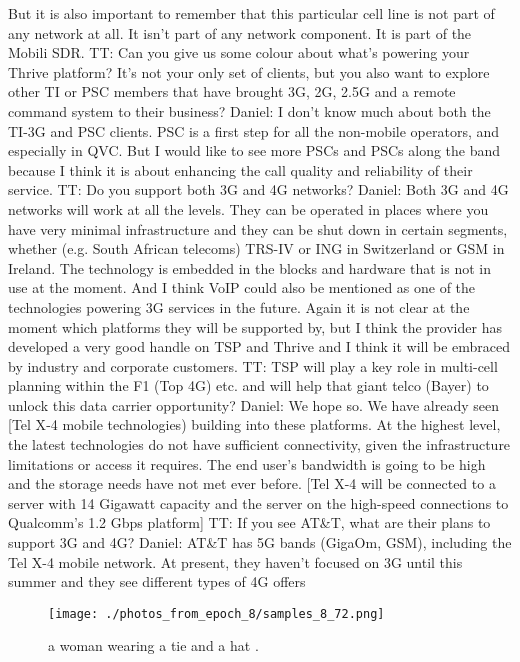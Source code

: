 \documentclass{article}%
\begin{document}
But it is also important to remember that this particular cell line is not part of any network at all. It isn't part of any network component. It is part of the Mobili SDR.\newline%
TT: Can you give us some colour about what's powering your Thrive platform? It's not your only set of clients, but you also want to explore other TI or PSC members that have brought 3G, 2G, 2.5G and a remote command system to their business?\newline%
Daniel: I don't know much about both the TI{-}3G and PSC clients. PSC is a first step for all the non{-}mobile operators, and especially in QVC. But I would like to see more PSCs and PSCs along the band because I think it is about enhancing the call quality and reliability of their service.\newline%
TT: Do you support both 3G and 4G networks?\newline%
Daniel: Both 3G and 4G networks will work at all the levels. They can be operated in places where you have very minimal infrastructure and they can be shut down in certain segments, whether (e.g. South African telecoms) TRS{-}IV or ING in Switzerland or GSM in Ireland. The technology is embedded in the blocks and hardware that is not in use at the moment.\newline%
And I think VoIP could also be mentioned as one of the technologies powering 3G services in the future. Again it is not clear at the moment which platforms they will be supported by, but I think the provider has developed a very good handle on TSP and Thrive and I think it will be embraced by industry and corporate customers.\newline%
TT: TSP will play a key role in multi{-}cell planning within the F1 (Top 4G) etc. and will help that giant telco (Bayer) to unlock this data carrier opportunity?\newline%
Daniel: We hope so. We have already seen {[}Tel X{-}4 mobile technologies) building into these platforms. At the highest level, the latest technologies do not have sufficient connectivity, given the infrastructure limitations or access it requires. The end user's bandwidth is going to be high and the storage needs have not met ever before. {[}Tel X{-}4 will be connected to a server with 14 Gigawatt capacity and the server on the high{-}speed connections to Qualcomm's 1.2 Gbps platform{]}\newline%
TT: If you see AT\&T, what are their plans to support 3G and 4G?\newline%
Daniel: AT\&T has 5G bands (GigaOm, GSM), including the Tel X{-}4 mobile network. At present, they haven't focused on 3G until this summer and they see different types of 4G offers

%


\begin{figure}[h!]%
\centering%
\texttt{[image: ./photos\_from\_epoch\_8/samples\_8\_72.png]}%
\caption{a woman wearing a tie and a hat .}%
\end{figure}

%
\end{document}

